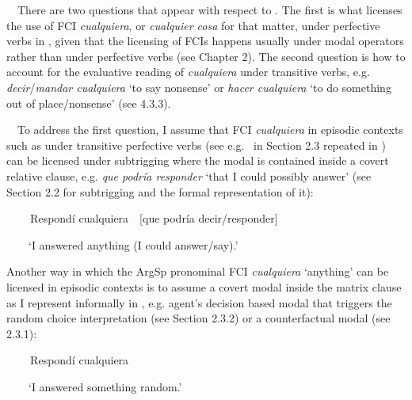 \begin{styleStandard}
\ \ There are two questions that appear with respect to . The first is what licenses the use of FCI \textit{cualquiera},\textit{ }or\textit{ cualquier cosa }for that matter, under perfective verbs in , given that the licensing of FCIs happens usually under modal operators rather than under perfective verbs (see Chapter 2). The second question is how to account for the evaluative reading of \textit{cualquiera} under transitive verbs, e.g. \textit{decir}/\textit{mandar cualquiera} ‘to say nonsense’ or \textit{hacer cualquiera} ‘to do something out of place/nonsense’ (see 4.3.3).
\end{styleStandard}

\begin{styleStandard}
\ \ To address the first question, I assume that FCI \textit{cualquiera} in episodic contexts such as under transitive perfective verbs (see e.g. \ in Section 2.3 repeated in ) can be licensed under subtrigging where the modal is contained inside a covert relative clause, e.g. \textit{que podría responder} ‘that I could possibly answer’ (see Section 2.2 for subtrigging and the formal representation of it):
\end{styleStandard}

\begin{styleStandard}
\label{bkm:Ref63461360}\textbf{\ \ }\ \ Respondí cualquiera\ \ [que podría decir/responder]
\end{styleStandard}

\begin{styleStandard}
\ \ \ \ ‘I answered anything (I could answer/say).’
\end{styleStandard}

\begin{styleStandard}
Another way in which the ArgSp pronominal FCI \textit{cualquiera} ‘anything’ can be licensed in episodic contexts is to assume a covert modal inside the matrix clause as I represent informally in , e.g. agent’s decision based modal that triggers the random choice interpretation (see Section 2.3.2) or a counterfactual modal (see 2.3.1):
\end{styleStandard}

\begin{styleStandard}
\label{bkm:Ref63461220}\textbf{\ \ }\ \ Respondí cualquiera
\end{styleStandard}

\begin{styleStandard}
\ \ \ \ ‘I answered something random.’
\end{styleStandard}

